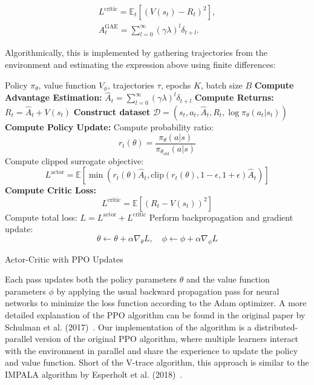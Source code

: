 \begin{gather*}
    L^{\text{critic}} = \mathbb{E}_t \left[ \left( V(s_t) - R_t \right)^2 \right],\\
    A^{\text{GAE}}_t = \sum_{l=0}^{\infty} (\gamma \lambda)^l \delta_{t+l}.
\end{gather*}

Algorithmically, this is implemented by gathering trajectories from the environment and estimating the expression above using finite differences:

\begin{algorithm}
    \begin{algorithmic}[1]
        \Require Policy $\pi_\theta$, value function $V_\phi$, trajectories $\tau$, epochs $K$, batch size $B$
        \State \textbf{Compute Advantage Estimation:}
        \State $\hat{A}_t = \sum_{l=0}^{\infty} (\gamma \lambda)^l \delta_{t+l}$
        \State \textbf{Compute Returns:} $R_t = \hat{A}_t + V(s_t)$
        \State \textbf{Construct dataset} $\mathcal{D} = (s_t, a_t, \hat{A}_t, R_t, \log \pi_\theta(a_t | s_t))$
                \State \textbf{Compute Policy Update:}
                \State Compute probability ratio:
                \[
                    r_t(\theta) = \frac{\pi_\theta(a | s)}{\pi_{\theta_{\text{old}}}(a | s)}
                \]
                \State Compute clipped surrogate objective:
                \[
                    L^{\text{actor}} = \mathbb{E} \left[ \min(r_t(\theta) \hat{A}_t, \text{clip}(r_t(\theta), 1 - \epsilon, 1 + \epsilon) \hat{A}_t) \right]
                \]
                \State \textbf{Compute Critic Loss:}
                \[
                    L^{\text{critic}} = \mathbb{E} \left[ (R_t - V(s_t))^2 \right]
                \]
                \State Compute total loss: $L = L^{\text{actor}} + L^{\text{critic}}$
                \State Perform backpropagation and gradient update:
                \[
                    \theta \gets \theta + \alpha \nabla_\theta L, \quad \phi \gets \phi + \alpha \nabla_\phi L
                \]
            \EndFor
        \EndFor
    \end{algorithmic}
    \caption{Actor-Critic with PPO Updates}
    \label{alg:ppo}
\end{algorithm}

Each pass updates both the policy parameters $\theta$ and the value function parameters $\phi$
by applying the usual backward propagation pass for neural networks to minimize the loss function according to the Adam optimizer.
A more detailed explanation of the PPO algorithm can be found in the original paper by Schulman et al. (2017)~\cite{Schulman2017}.
Our implementation of the algorithm is a distributed-parallel version of the original PPO algorithm,
where multiple learners interact with the environment in parallel and share the experience to update the policy and value function.
Short of the V-trace algorithm, this approach is similar to the IMPALA algorithm by Esperholt et al. (2018)~\cite{Espeholt2018}.

